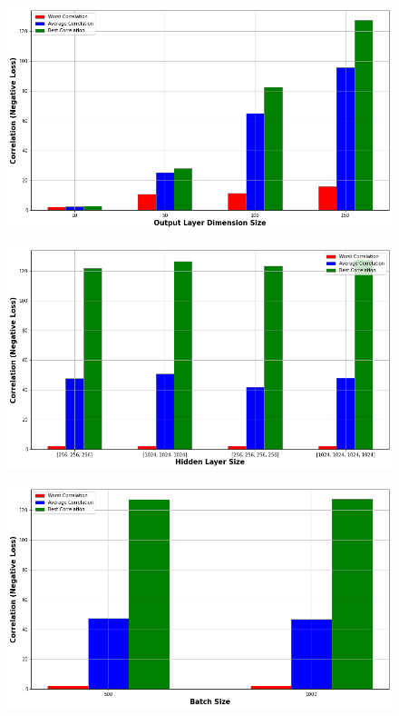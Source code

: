 {\section{}

\begin{figure}[H]
    \centering
    \includegraphics[width=\textwidth]{figures/DCCA_optimizations/NMF_Outdim.png}
    \caption{}
\end{figure}
\begin{figure}[H]
    \centering
    \includegraphics[width=\textwidth]{figures/DCCA_optimizations/NMF_Hidden.png}
    \caption{}
\end{figure}
\begin{figure}[H]
    \centering
    \includegraphics[width=\textwidth]{figures/DCCA_optimizations/NMF_Batch.png}

\end{figure}}
